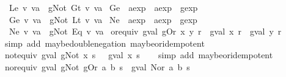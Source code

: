 \begin{isabellebody}
\ \ {\isachardoublequoteopen}Le\ v\ va\ {\isasymequiv}\ gNot\ {\isacharparenleft}Gt\ v\ va{\isacharparenright}{\isachardoublequoteclose}\isanewline
\isanewline
{}\isamarkupfalse%
\ Ge\ {\isacharcolon}{\isacharcolon}\ {\isachardoublequoteopen}aexp\ {\isasymRightarrow}\ aexp\ {\isasymRightarrow}\ gexp{\isachardoublequoteclose}\ \ \isanewline
\ \ {\isachardoublequoteopen}Ge\ v\ va\ {\isasymequiv}\ gNot\ {\isacharparenleft}Lt\ v\ va{\isacharparenright}{\isachardoublequoteclose}\isanewline
\isanewline
{}\isamarkupfalse%
\ Ne\ {\isacharcolon}{\isacharcolon}\ {\isachardoublequoteopen}aexp\ {\isasymRightarrow}\ aexp\ {\isasymRightarrow}\ gexp{\isachardoublequoteclose}\ \ \isanewline
\ \ {\isachardoublequoteopen}Ne\ v\ va\ {\isasymequiv}\ gNot\ {\isacharparenleft}Eq\ v\ va{\isacharparenright}{\isachardoublequoteclose}\isanewline
\isanewline
{}\isamarkupfalse%
\ or{\isacharunderscore}equiv{\isacharcolon}\ {\isachardoublequoteopen}gval\ {\isacharparenleft}gOr\ x\ y{\isacharparenright}\ r\ {\isacharequal}\ {\isacharparenleft}gval\ x\ r{\isacharparenright}\ {\isasymor}\isactrlsub {\isacharquery}\ {\isacharparenleft}gval\ y\ r{\isacharparenright}{\isachardoublequoteclose}\isanewline
%
\isadelimproof
\ \ %
\endisadelimproof
%
\isatagproof
{}\isamarkupfalse%
\ {\isacharparenleft}simp\ add{\isacharcolon}\ maybe{\isacharunderscore}double{\isacharunderscore}negation\ maybe{\isacharunderscore}or{\isacharunderscore}idempotent{\isacharparenright}%
\endisatagproof
{\isafoldproof}%
%
\isadelimproof
\isanewline
%
\endisadelimproof
\isanewline
{}\isamarkupfalse%
\ not{\isacharunderscore}equiv{\isacharcolon}\ {\isachardoublequoteopen}gval\ {\isacharparenleft}gNot\ x{\isacharparenright}\ s\ {\isacharequal}\ {\isasymnot}\isactrlsub {\isacharquery}\ {\isacharparenleft}gval\ x\ s{\isacharparenright}{\isachardoublequoteclose}\isanewline
%
\isadelimproof
\ \ %
\endisadelimproof
%
\isatagproof
{}\isamarkupfalse%
\ {\isacharparenleft}simp\ add{\isacharcolon}\ maybe{\isacharunderscore}or{\isacharunderscore}idempotent{\isacharparenright}%
\endisatagproof
{\isafoldproof}%
%
\isadelimproof
\isanewline
%
\endisadelimproof
\isanewline
{}\isamarkupfalse%
\ nor{\isacharunderscore}equiv{\isacharcolon}\ {\isachardoublequoteopen}gval\ {\isacharparenleft}gNot\ {\isacharparenleft}gOr\ a\ b{\isacharparenright}{\isacharparenright}\ s\ {\isacharequal}\ gval\ {\isacharparenleft}Nor\ a\ b{\isacharparenright}\ s{\isachardoublequoteclose}\isanewline
%
\isadelimproof

\end{isabellebody}

